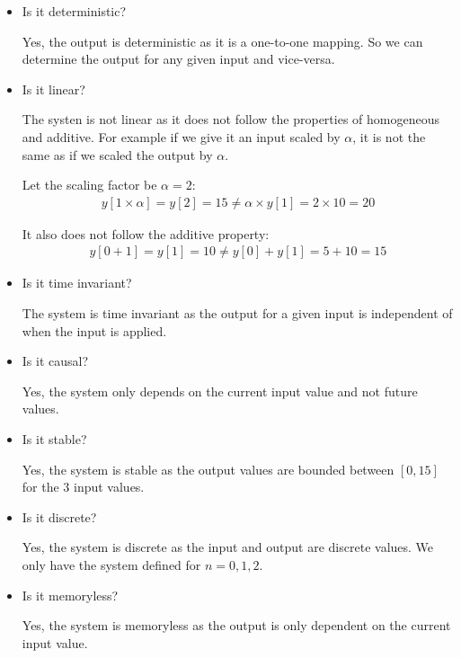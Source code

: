 \documentclass{article}
\begin{document}
\begin{itemize}
    \item Is it deterministic? 
    
    Yes, the output is deterministic as it is a one-to-one mapping. So we can determine the output for any given input and vice-versa.

    \item Is it linear?
    
    The systen is not linear as it does not follow the properties of homogeneous and additive. For example if we give it an input scaled by $\alpha$, it is not the same as if we scaled the output by $\alpha$.

    Let the scaling factor be $\alpha = 2$:
    \begin{align*}
        y[1 \times \alpha] = y[2] = 15 \neq \alpha \times y[1] = 2 \times 10 = 20
    \end{align*}

    It also does not follow the additive property:
    \begin{align*}
        y[0 + 1] = y[1] = 10 \neq y[0] + y[1] = 5 + 10 = 15
    \end{align*}

    \item Is it time invariant?
    
    The system is time invariant as the output for a given input is independent of when the input is applied. 

    \item Is it causal?

    Yes, the system only depends on the current input value and not future values.

    \item Is it stable?

    Yes, the system is stable as the output values are bounded between $[0, 15]$ for the 3 input values.

    \item Is it discrete?

    Yes, the system is discrete as the input and output are discrete values. We only have the system defined for $n = 0, 1, 2$.

    \item Is it memoryless?

    Yes, the system is memoryless as the output is only dependent on the current input value.
\end{itemize}

\end{document}
